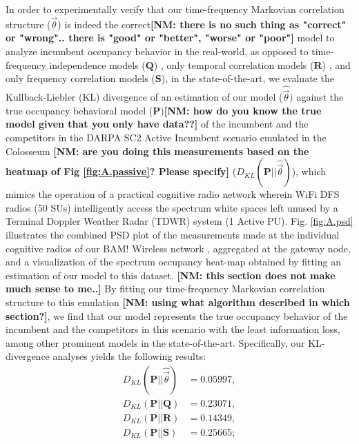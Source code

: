 \documentclass[12pt, draftcls, onecolumn]{IEEEtran}
\newcommand{\nm}[1]{{\color{blue}\bf{[NM: #1]}}}
\begin{document}
In order to experimentally verify that our time-frequency Markovian correlation structure ($\vec{\theta}$) is indeed the correct\nm{there is no such thing as "correct" or "wrong".. there is "good" or "better", "worse" or "poor"} model to analyze incumbent occupancy behavior in the real-world, as opposed to time-frequency independence models ($\mathbf{Q}$) \cite{WCL:4, WCL:10, WCL:9, WCL:11, WCL:8}, only temporal correlation models ($\mathbf{R}$) \cite{WCL:5}, and only frequency correlation models ($\mathbf{S}$), in the state-of-the-art, we evaluate the Kullback-Liebler (KL) divergence of an estimation of our model ($\hat{\vec{\theta}})$ against the true occupancy behavioral model ($\mathbf{P}$)\nm{how do you know the true model given that you only have data??} of the incumbent and the competitors in the DARPA SC2 Active Incumbent scenario emulated in the Colosseum
\nm{are you doing this measurements based on the heatmap of Fig \ref{fig:A.passive}? Please specify}
 \cite{DARPA:SC2, DARPA:SC2c2api, DARPA:ActiveIncumbent, DARPA:SC2scenarios} ($D_{KL}(\mathbf{P}{||}\hat{\vec{\theta}})$), which mimics the operation of a practical cognitive radio network wherein WiFi DFS radios (50 SUs) intelligently access the spectrum white spaces left unused by a Terminal Doppler Weather Radar (TDWR) system (1 Active PU). Fig. \ref{fig:A.psd} illustrates the combined PSD plot of the measurements made at the individual cognitive radios of our BAM! Wireless network \cite{BAM}, aggregated at the gateway node, and a visualization of the spectrum occupancy heat-map obtained by fitting an estimation of our model to this dataset.
 \nm{this section does not make much sense to me..}
  By fitting our time-frequency Markovian correlation structure to this emulation \nm{using what algorithm described in which section?}, we find that our model represents the true occupancy behavior of the incumbent and the competitors in this scenario with the least information loss, among other prominent models in the state-of-the-art. Specifically, our KL-divergence analyses yields the following results:
\begin{equation}
    \begin{aligned}
        D_{KL}(\mathbf{P}{||}\hat{\vec{\theta}}) &= 0.05997,\\
        D_{KL}(\mathbf{P}{||}\mathbf{Q}) &= 0.23071,\\
        D_{KL}(\mathbf{P}{||}\mathbf{R}) &= 0.14349,\\
        D_{KL}(\mathbf{P}{||}\mathbf{S}) &= 0.25665;
    \end{aligned}
\end{equation}
\end{document}
